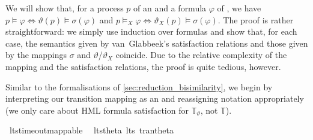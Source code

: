 %
\begin{isabellebody}%
%
%
\isadelimtheory
%
\endisadelimtheory
%
\isatagtheory
%
\endisatagtheory
{\isafoldtheory}%
%
\isadelimtheory
%
\endisadelimtheory
%
\isadelimdocument
%
\endisadelimdocument
%
\isatagdocument
%
\isamarkuptrue%
%
\endisatagdocument
{\isafolddocument}%
%
\isadelimdocument
%
\endisadelimdocument
%
\begin{isamarkuptext}%
\label{sec:reduction_satisfaction}%
\end{isamarkuptext}\isamarkuptrue%
%
\begin{isamarkuptext}%
We will show that, for a process $p$ of an \LTSt{} and a formula $\varphi$ of \HMLt{}, we have $p \vDash \varphi \iff \vartheta(p) \vDash \sigma(\varphi)$ and $p \vDash_X \varphi \iff \vartheta_X(p) \vDash \sigma(\varphi)$. The proof is rather straightforward: we simply use induction over \HMLt{} formulas and show that, for each case, the semantics given by van~Glabbeek's satisfaction relations and those given by the mappings $\sigma$ and $\vartheta$/$\vartheta_X$ coincide. Due to the relative complexity of the mapping and the satisfaction relations, the proof is quite tedious, however.%
\end{isamarkuptext}\isamarkuptrue%
%
\isadelimdocument
%
\endisadelimdocument
%
\isatagdocument
%
\isamarkuptrue%
%
\endisatagdocument
{\isafolddocument}%
%
\isadelimdocument
%
\endisadelimdocument
%
\begin{isamarkuptext}%
Similar to the formalisations of \cref{sec:reduction_bisimilarity}, we begin by interpreting our transition mapping  as an  and reassigning notation appropriately (we only care about HML formula satisfaction for $\mathbb{T}_\vartheta$, not $\mathbb{T}$).%
\end{isamarkuptext}\isamarkuptrue%
\isamarkupfalse%
\ lts{\isacharunderscore}{\kern0pt}timeout{\isacharunderscore}{\kern0pt}mappable\ \isanewline
\isanewline
{}\isamarkupfalse%
\ lts{\isacharunderscore}{\kern0pt}theta{\isacharcolon}{\kern0pt}\ lts\ tran{\isacharunderscore}{\kern0pt}theta%
\isadelimproof
\ %
\endisadelimproof
%
\isatagproof
\isacommand{{\isachardot}{\kern0pt}}\isamarkupfalse%
%
\endisatagproof
{\isafoldproof}%
%
\isadelimproof
%
\endisadelimproof
\isanewline
{}\isamarkupfalse%

\end{isabellebody}
